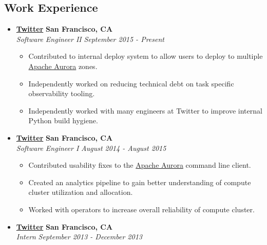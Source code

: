 \documentclass[10pt,letterpaper]{article}
\begin{document}
\subsection*{Work Experience}
  \begin{itemize}
    \parskip=-0.5em

    \item[]
    {\href{http://www.twitter.com}{\textbf{Twitter}} \hfill
      \textbf{San Francisco, CA}}
    \\
    {\emph{Software Engineer II} \hfill \emph{September 2015 - Present}}

    \begin{itemize}[label=\textbullet]
      \itemsep0em
      \item Contributed to internal deploy system to allow users to deploy to
        multiple \href{aurora.apache.org}{Apache Aurora} zones.
      \item Independently worked on reducing technical debt on task specific
        observability tooling.
      \item Independently worked with many engineers at Twitter to improve
        internal Python build hygiene.
    \end{itemize}


    \item[]
    {\href{http://www.twitter.com}{\textbf{Twitter}} \hfill
      \textbf{San Francisco, CA}}
    \\
    {\emph{Software Engineer I} \hfill \emph{August 2014 - August 2015}}

    \begin{itemize}[label=\textbullet]
      \itemsep0em
      \item Contributed usability fixes to the
        \href{aurora.apache.org}{Apache Aurora} command line client.
      \item Created an analytics pipeline to gain better understanding of
        compute cluster utilization and allocation.
      \item Worked with operators to increase overall reliability of compute
        cluster.
    \end{itemize}

    \item[]
    {\href{http://www.twitter.com}{\textbf{Twitter}} \hfill
      \textbf{San Francisco, CA}}
    \\
    {\emph{Intern} \hfill \emph{September 2013 - December 2013}}


\end{itemize}
\end{document}
